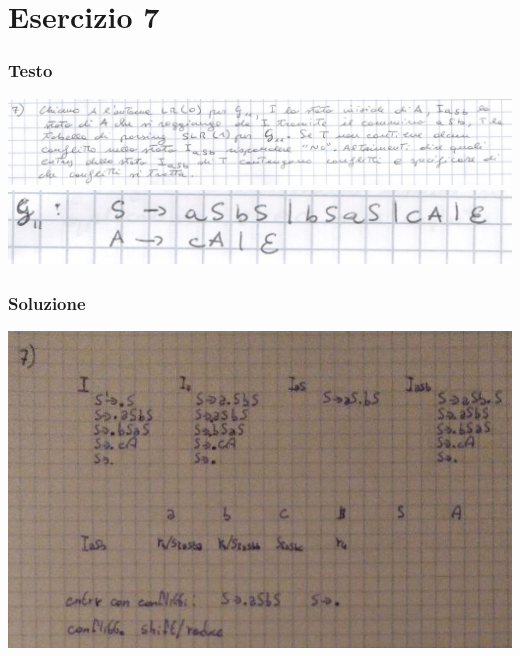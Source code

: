 \chapter{Esercizio 7}

\subsection{Testo}

\begin{center}
    \includegraphics[scale=0.2]{Chapters/Img/07text.png}\\
    \includegraphics[scale=0.2]{Chapters/Img/g11.png}\\
\end{center} 

\subsection{Soluzione}

\begin{center}
    \includegraphics[scale=0.6]{Chapters/Img/07solution.png}\\
\end{center} 

